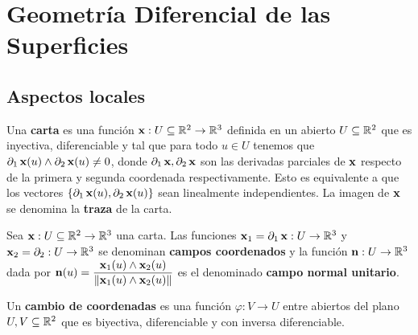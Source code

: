 \chapter{Geometría Diferencial de las Superficies}

\section{Aspectos locales}

\begin{defn}
Una \textbf{carta} es una función $\operatorname{\mathbf{x}}:U\subseteq\mathbb{R}^2\to\mathbb{R}^3$ definida en un abierto $U\subseteq \mathbb{R}^2$ que es inyectiva, diferenciable y tal que para todo $u\in U$ tenemos que $\partial_1 \operatorname{\mathbf{x}}(u)\wedge \partial_2 \operatorname{\mathbf{x}}(u) \neq 0$, donde $\partial_1 \operatorname{\mathbf{x}},\partial_2 \operatorname{\mathbf{x}}$ son las derivadas parciales de $\operatorname{\mathbf{x}}$ respecto de la primera y segunda coordenada respectivamente. Esto es equivalente a que los vectores $\{\partial_1 \operatorname{\mathbf{x}}(u),\partial_2 \operatorname{\mathbf{x}}(u)\}$ sean linealmente independientes. La imagen de $\operatorname{\mathbf{x}}$ se denomina la \textbf{traza} de la carta.
\end{defn}

\begin{defn}
Sea $\operatorname{\mathbf{x}}:U\subseteq\mathbb{R}^2\to\mathbb{R}^3$ una carta. Las funciones $\operatorname{\mathbf{x}}_1=\partial_1 \operatorname{\mathbf{x}}:U\to\mathbb{R}^3$ y $\operatorname{\mathbf{x}}_2=\partial_2:U\to\mathbb{R}^3$ se denominan \textbf{campos coordenados} y la función $\operatorname{\mathbf{n}}:U\to\mathbb{R}^3$ dada por $\operatorname{\mathbf{n}}(u)=\dfrac{\operatorname{\mathbf{x}}_1(u)\wedge \operatorname{\mathbf{x}}_2(u)}{\left\| \operatorname{\mathbf{x}}_1(u)\wedge \operatorname{\mathbf{x}}_2(u) \right\|}$ es el denominado \textbf{campo normal unitario}.
\end{defn}

\begin{defn}
Un \textbf{cambio de coordenadas} es una función $\varphi:V\to U$ entre abiertos del plano $U,V\subseteq\mathbb{R}^2$ que es biyectiva, diferenciable y con inversa diferenciable.
\end{defn}

